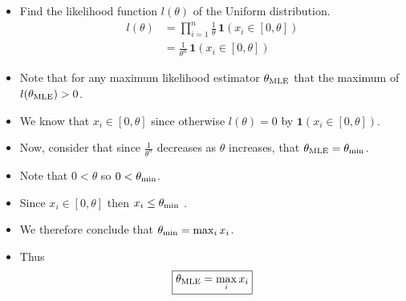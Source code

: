 \begin{itemize}
    \item[] Find the likelihood function $l(\theta)$ of the Uniform distribution.
    \begin{align*}
	l(\theta) &= \prod_{i=1}^n \frac{1}{\theta} \, \mathbf{1} (x_i \in [0, \theta]) \\
	    &= \frac{1}{\theta^n} \, \mathbf{1} (x_i \in [0, \theta])
    \end{align*}
    \item[] Note that for any maximum likelihood estimator $\theta_{{\rm MLE}}$ that the maximum of $l(\theta_{{\rm MLE}}) > 0$.
    \item[] We know that $x_i \in [0, \theta]$ since otherwise $l(\theta) = 0$ by $\mathbf{1} (x_i \in [0, \theta])$. 
    \item[] Now, consider that since $\frac{1}{\theta^n}$ decreases as $\theta$ increases, that $\theta_{{\rm MLE}} = \theta_{{\rm min}}$.
    \item[] Note that $0 < \theta$ so $0 < \theta_{\rm min}$.
    \item[] Since $x_i \in [0, \theta]$ then $x_i \leq \theta_{\rm min}$ .
    \item[] We therefore conclude that $\theta_{\rm min} = \max_i x_i$.
    \item[] Thus $$\boxed{ \theta_{\rm MLE} = \max_i x_i}$$
\end{itemize}
